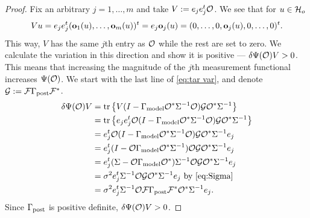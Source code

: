 \documentclass{amsart}
\numberwithin{equation}{section}
\providecommand{\DIFaddbegin}{} %
\providecommand{\DIFaddend}{} %
\providecommand{\DIFdelend}{} %
\begin{document}
\DIFdelend \DIFaddbegin \biggerbetter
\begin{proof} 
  Fix an arbitrary $j=1,\dots,m$ and take $V:= e_j e_j^t \mathcal{O}$. We see
  that for $u \in \mathcal{H}_o$
  \begin{equation*}
    Vu = e_je_j^t (\mathbf{o}_1(u),\dots,\mathbf{o}_m(u) )^t = e_j \mathbf{o}_j(u)
    = (0,\dots,0,\mathbf{o}_j(u),0,\dots,0)^t.
  \end{equation*}
  This way, $V$ has the same $j$th entry as $\mathcal{O}$ while the rest are
  set to zero. We calculate the variation in this direction and show
  it is positive --- $\delta \Psi(\mathcal{O})V > 0$. This means that
  increasing the magnitude of the $j$th measurement functional
  increases $\Psi(\mathcal{O})$. We start with the last line of \eqref{eq:tar
    var}, and denote $\mathcal{G} : = \mathcal{F} \Gamma_{\textup{post}} \mathcal{F}^*$.
  \begin{align*}
     \delta \Psi(\mathcal{O}) V 
    &= \textup{tr}\left \{V ( I - \Gamma_{\textup{model}} \mathcal{O}^*\Sigma^{-1}\mathcal{O}) \mathcal{G} \mathcal{O}^* \Sigma^{-1} \right \} \\
    &= \textup{tr}\left \{e_je_j^t \mathcal{O} ( I - \Gamma_{\textup{model}} \mathcal{O}^*\Sigma^{-1}\mathcal{O}) \mathcal{G} \mathcal{O}^* \Sigma^{-1} \right \} \\
    &= e_j^t \mathcal{O} ( I - \Gamma_{\textup{model}} \mathcal{O}^*\Sigma^{-1}\mathcal{O}) \mathcal{G} \mathcal{O}^* \Sigma^{-1}e_j \\
    &= e_j^t ( I - \mathcal{O} \Gamma_{\textup{model}} \mathcal{O}^*\Sigma^{-1})\mathcal{O} \mathcal{G} \mathcal{O}^* \Sigma^{-1}e_j \\  
    &=  e_j^t(\Sigma-\mathcal{O} \Gamma_{\textup{model}} \mathcal{O}^*) \Sigma^{-1}\mathcal{O} \mathcal{G} \mathcal{O}^* \Sigma^{-1}e_j \\
    &=\sigma^2 e_j^t \Sigma^{-1}\mathcal{O} \mathcal{G} \mathcal{O}^* \Sigma^{-1}e_j
    \text{ by \eqref{eq:Sigma} }\\
    &=\sigma^2 e_j^t \Sigma^{-1}\mathcal{O} \mathcal{F} \Gamma_{\textup{post}} \mathcal{F}^* \mathcal{O}^* \Sigma^{-1}e_j.
  \end{align*} 
  Since $\Gamma_{\textup{post}}$ is positive definite, $\delta \Psi(\mathcal{O}) V > 0$.
\end{proof}
\DIFaddend 
\end{document}
